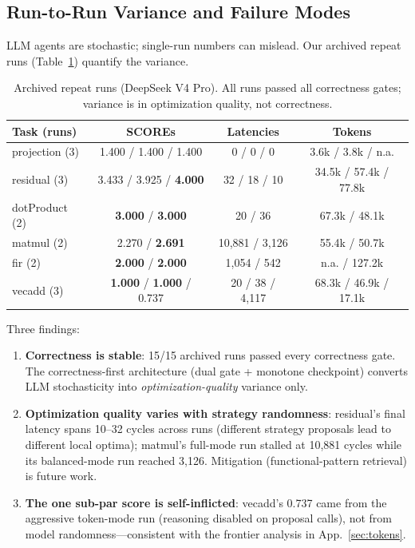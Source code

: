 \documentclass[10pt,conference,letterpaper]{IEEEtran}
\begin{document}
\subsection{Run-to-Run Variance and Failure Modes}
\label{sec:variance}

LLM agents are stochastic; single-run numbers can mislead. Our archived repeat runs (Table~\ref{tab:variance}) quantify the variance.

\begin{table}[h]
\centering
\caption{Archived repeat runs (DeepSeek V4 Pro). All runs passed all correctness gates; variance is in optimization quality, not correctness.}
\label{tab:variance}
\footnotesize
\begin{tabular}{lccc}
\toprule
\textbf{Task (runs)} & \textbf{SCOREs} & \textbf{Latencies} & \textbf{Tokens} \\
\midrule
projection (3) & 1.400 / 1.400 / 1.400 & 0 / 0 / 0 & 3.6k / 3.8k / n.a. \\
residual (3) & 3.433 / 3.925 / \textbf{4.000} & 32 / 18 / 10 & 34.5k / 57.4k / 77.8k \\
dotProduct (2) & \textbf{3.000} / \textbf{3.000} & 20 / 36 & 67.3k / 48.1k \\
matmul (2) & 2.270 / \textbf{2.691} & 10,881 / 3,126 & 55.4k / 50.7k \\
fir (2) & \textbf{2.000} / \textbf{2.000} & 1,054 / 542 & n.a. / 127.2k \\
vecadd (3) & \textbf{1.000} / \textbf{1.000} / 0.737 & 20 / 38 / 4,117 & 68.3k / 46.9k / 17.1k \\
\bottomrule
\end{tabular}
\end{table}

Three findings:
\begin{enumerate}
    \item \textbf{Correctness is stable}: 15/15 archived runs passed every correctness gate. The correctness-first architecture (dual gate + monotone checkpoint) converts LLM stochasticity into \emph{optimization-quality} variance only.
    \item \textbf{Optimization quality varies with strategy randomness}: residual's final latency spans 10--32 cycles across runs (different strategy proposals lead to different local optima); matmul's full-mode run stalled at 10,881 cycles while its balanced-mode run reached 3,126. Mitigation (functional-pattern retrieval) is future work.
    \item \textbf{The one sub-par score is self-inflicted}: vecadd's 0.737 came from the aggressive token-mode run (reasoning disabled on proposal calls), not from model randomness---consistent with the frontier analysis in App.~\ref{sec:tokens}.
\end{enumerate}
\end{document}
